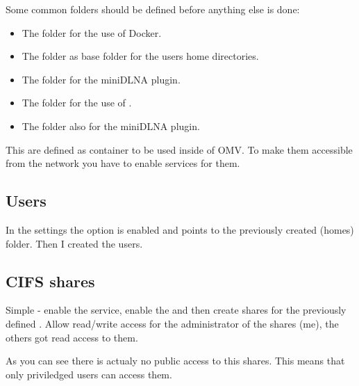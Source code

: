 Some common folders should be defined before anything else is done:

\begin{itemize}
    \item The folder  for the use of \gls{Docker}.
    \item The folder  as base folder for the users home directories.
    \item The folder  for the miniDLNA plugin.
    \item The folder  for the use of .
    \item The folder  also for the miniDLNA plugin.
\end{itemize}


This  are defined as container to be used inside
of \gls{OMV}. To make them accessible from the network you have to enable
services for them.

\subsection{Users}

In the settings the option  is enabled and
points to the previously created \tsFontCode(homes) folder. Then I created
the users.


\subsection{CIFS shares}

Simple - enable the  service, enable the  and then create shares for the previously defined . Allow read/write access for the administrator of the shares (me),
the others got read access to them.



As you can see there is actualy no public access to this shares. This means
that only priviledged users can access them.

